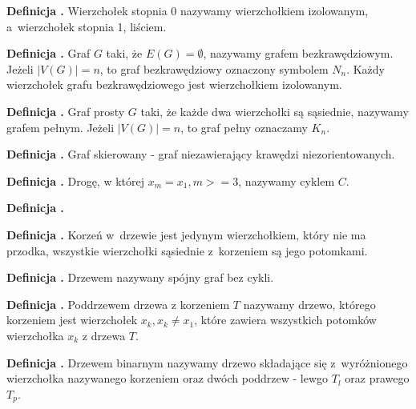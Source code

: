 \noindent
\textbf{Definicja .}
\incrementdefinitionIndex
Wierzchołek stopnia 0 nazywamy wierzchołkiem izolowanym, a~wierzchołek stopnia 1, liściem.

\noindent
\textbf{Definicja .}
\incrementdefinitionIndex
Graf $G$ taki, że $E(G) = \emptyset$, nazywamy grafem bezkrawędziowym. Jeżeli $|V(G)| = n$, to graf bezkrawędziowy oznaczony symbolem $N_n$.
Każdy wierzchołek grafu bezkrawędziowego jest wierzchołkiem izolowanym.

\noindent
\textbf{Definicja .}
\incrementdefinitionIndex
Graf prosty $G$ taki, że każde dwa wierzchołki są sąsiednie, nazywamy grafem pełnym.
Jeżeli $|V(G)| = n$, to graf pełny oznaczamy $K_n$.

\noindent
\textbf{Definicja .}
\incrementdefinitionIndex
Graf skierowany - graf niezawierający krawędzi niezorientowanych.

\noindent
\textbf{Definicja .}
\incrementdefinitionIndex
Drogę, w której $x_m = x_1, m >= 3$, nazywamy cyklem $C$.

\noindent
\textbf{Definicja .}
\incrementdefinitionIndex

\noindent
\textbf{Definicja .}
\incrementdefinitionIndex
Korzeń w~drzewie jest jedynym wierzchołkiem,
który nie ma przodka, wszystkie wierzchołki sąsiednie z~korzeniem są jego potomkami.

\noindent
\textbf{Definicja .}
\incrementdefinitionIndex
Drzewem nazywany spójny graf bez cykli.

\noindent
\textbf{Definicja .}
\incrementdefinitionIndex
Poddrzewem drzewa z korzeniem $T$ nazywamy drzewo, którego korzeniem jest wierzchołek $x_k, x_k \neq x_1$,
które zawiera wszystkich potomków wierzchołka $x_k$ z drzewa $T$.

\noindent
\textbf{Definicja .}
\incrementdefinitionIndex
Drzewem binarnym nazywamy drzewo składające się z~wyróżnionego wierzchołka nazywanego korzeniem oraz dwóch poddrzew
- lewgo $T_l$ oraz prawego $T_p$.